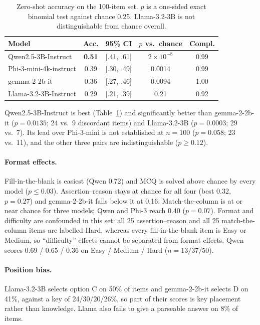 \documentclass[10pt,twocolumn,letterpaper]{article}
\begin{document}
\begin{table}[t]
\centering
\small
\setlength{\tabcolsep}{4pt}
\begin{tabular}{@{}lcccc@{}}
\toprule
\textbf{Model} & \textbf{Acc.} & \textbf{95\% CI} & \textbf{$p$ vs.\ chance} & \textbf{Compl.} \\
\midrule
Qwen2.5-3B-Instruct     & \textbf{0.51} & [.41, .61] & $2 \times 10^{-8}$ & 0.99 \\
Phi-3-mini-4k-instruct  & 0.39 & [.30, .49] & 0.0014             & 0.99 \\
gemma-2-2b-it           & 0.36 & [.27, .46] & 0.0094             & 1.00 \\
Llama-3.2-3B-Instruct   & 0.29 & [.21, .39] & 0.21               & 0.92 \\
\bottomrule
\end{tabular}
\caption{Zero-shot accuracy on the 100-item set. $p$ is a one-sided exact binomial
test against chance 0.25. Llama-3.2-3B is not distinguishable from chance overall.}
\label{tab:baselines}
\end{table}

Qwen2.5-3B-Instruct is best (Table~\ref{tab:baselines}) and significantly better
than gemma-2-2b-it ($p=0.0135$; 24 vs.\ 9 discordant items) and Llama-3.2-3B
($p=0.0003$; 29 vs.\ 7). Its lead over Phi-3-mini is not established at $n=100$
($p=0.058$; 23 vs.\ 11), and the other three pairs are indistinguishable ($p \ge 0.12$).

\paragraph{Format effects.}
Fill-in-the-blank is easiest (Qwen 0.72) and MCQ is solved above chance by every
model ($p \le 0.03$). Assertion--reason stays at chance for all four (best 0.32,
$p=0.27$) and gemma-2-2b-it falls below it at 0.16. Match-the-column is at or
near chance for three models; Qwen and Phi-3 reach 0.40 ($p=0.07$). Format and
difficulty are confounded in this set: all 25 assertion--reason and all 25
match-the-column items are labelled Hard, whereas every fill-in-the-blank item is
Easy or Medium, so ``difficulty'' effects cannot be separated from format effects.
Qwen scores 0.69 / 0.65 / 0.36 on Easy / Medium / Hard ($n = 13 / 37 / 50$).

\paragraph{Position bias.}
Llama-3.2-3B selects option C on 50\% of items and gemma-2-2b-it selects D on
41\%, against a key of 24/30/20/26\%, so part of their scores is key placement
rather than knowledge. Llama also fails to give a parseable answer on 8\% of items.
\end{document}
